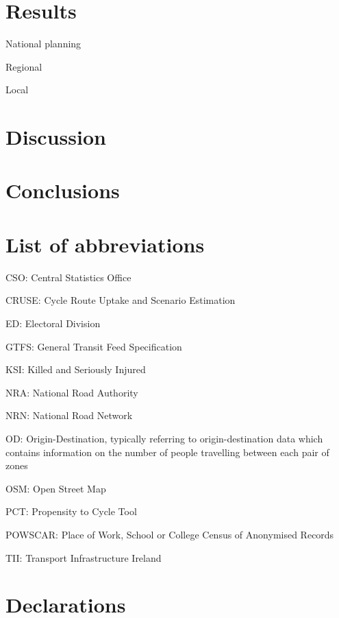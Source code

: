 \documentclass[
  super,
  preprint,
  3p]{elsarticle}
\begin{document}
\hypertarget{sec-results}{%
\section{Results}\label{sec-results}}

National planning

Regional

Local

\hypertarget{sec-discussion}{%
\section{Discussion}\label{sec-discussion}}

\hypertarget{sec-conclusions}{%
\section{Conclusions}\label{sec-conclusions}}

\hypertarget{list-of-abbreviations}{%
\section{List of abbreviations}\label{list-of-abbreviations}}

CSO: Central Statistics Office

CRUSE: Cycle Route Uptake and Scenario Estimation

ED: Electoral Division

GTFS: General Transit Feed Specification

KSI: Killed and Seriously Injured

NRA: National Road Authority

NRN: National Road Network

OD: Origin-Destination, typically referring to origin-destination data
which contains information on the number of people travelling between
each pair of zones

OSM: Open Street Map

PCT: Propensity to Cycle Tool

POWSCAR: Place of Work, School or College Census of Anonymised Records

TII: Transport Infrastructure Ireland

\hypertarget{declarations}{%
\section{Declarations}\label{declarations}}
\end{document}
